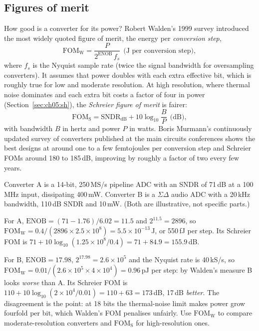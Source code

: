 \subsection{Figures of merit}

How good is a converter for its power? Robert Walden's 1999 survey introduced the most widely
quoted figure of merit, the energy per \emph{conversion step},
\begin{equation}
\mathrm{FOM}_{\text{W}}=\frac{P}{2^{\text{ENOB}}\,f_s}\ \ \text{(J per conversion step)},
\label{eq:ch05:walden}
\end{equation}
where $f_s$ is the Nyquist sample rate (twice the signal bandwidth for oversampling converters).
It assumes that power doubles with each extra effective bit, which is roughly true for low and
moderate resolution. At high resolution, where thermal noise dominates and each extra bit costs a
factor of four in power (Section~\ref{sec:ch05:sh}), the \emph{Schreier figure of merit} is fairer:
\begin{equation}
\mathrm{FOM}_{\text{S}}=\text{SNDR}_{\text{dB}}+10\log_{10}\frac{B}{P}\ \ \text{(dB)},
\label{eq:ch05:schreier}
\end{equation}
with bandwidth $B$ in hertz and power $P$ in watts. Boris Murmann's continuously updated survey of
converters published at the main circuits conferences shows the best designs at around one to a few
femtojoules per conversion step and Schreier FOMs around 180 to 185\,dB, improving by roughly a factor of two
every few years.


\begin{worked}
Converter A is a 14-bit, 250\,MS/s pipeline ADC with an SNDR of 71\,dB at a 100\,MHz input,
dissipating 400\,mW. Converter B is a $\Sigma\Delta$ audio ADC with a 20\,kHz bandwidth, 110\,dB
SNDR and 10\,mW. (Both are illustrative, not specific parts.)

For A, $\text{ENOB}=(71-1.76)/6.02=11.5$ and $2^{11.5}=2896$, so
$\mathrm{FOM}_{\text{W}}=0.4/(2896\times2.5\times10^8)=5.5\times10^{-13}$\,J, or 550\,fJ per step.
Its Schreier FOM is $71+10\log_{10}(1.25\times10^8/0.4)=71+84.9=155.9$\,dB.

For B, $\text{ENOB}=17.98$, $2^{17.98}=2.6\times10^5$ and the Nyquist rate is 40\,kS/s, so
$\mathrm{FOM}_{\text{W}}=0.01/(2.6\times10^5\times4\times10^4)=0.96$\,pJ per step: by Walden's
measure B looks \emph{worse} than A. Its Schreier FOM is $110+10\log_{10}(2\times10^4/0.01)=110+63=173$\,dB,
17\,dB \emph{better}. The disagreement is the point: at 18 bits the thermal-noise limit makes
power grow fourfold per bit, which Walden's FOM penalises unfairly. Use $\mathrm{FOM}_{\text{W}}$
to compare moderate-resolution converters and $\mathrm{FOM}_{\text{S}}$ for high-resolution ones.
\end{worked}

